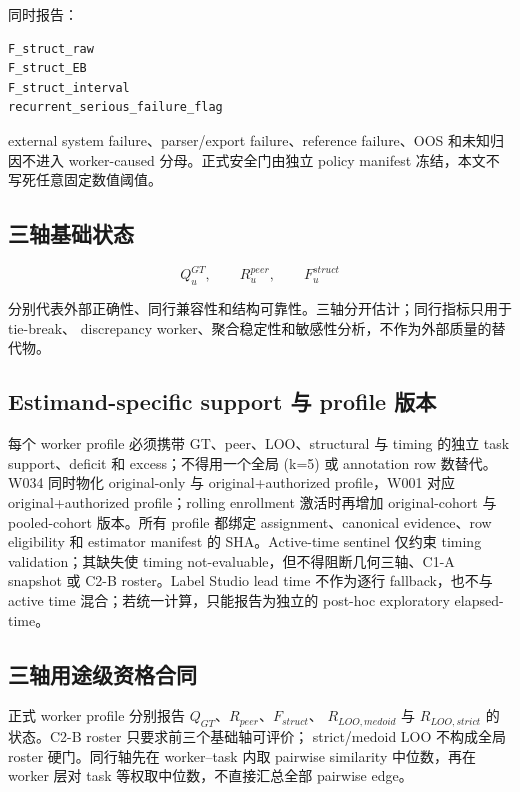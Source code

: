 同时报告：

\begin{verbatim}
F_struct_raw
F_struct_EB
F_struct_interval
recurrent_serious_failure_flag
\end{verbatim}

external system failure、parser/export failure、reference failure、OOS 和未知归因不进入
worker-caused 分母。正式安全门由独立 policy manifest 冻结，本文不写死任意固定数值阈值。

\subsection{三轴基础状态}

\[
Q^{GT}_u,\qquad R^{peer}_u,\qquad F^{struct}_u
\]

分别代表外部正确性、同行兼容性和结构可靠性。三轴分开估计；同行指标只用于 tie-break、
discrepancy worker、聚合稳定性和敏感性分析，不作为外部质量的替代物。

\subsection{Estimand-specific support 与 profile 版本}

每个 worker profile 必须携带 GT、peer、LOO、structural 与 timing 的独立 task support、deficit
和 excess；不得用一个全局 (k=5) 或 annotation row 数替代。W034 同时物化 original-only 与
original+authorized profile，W001 对应 original+authorized profile；rolling enrollment 激活时再增加
original-cohort 与 pooled-cohort 版本。所有 profile 都绑定 assignment、canonical evidence、row
eligibility 和 estimator manifest 的 SHA。Active-time sentinel 仅约束 timing validation；其缺失使 timing
not-evaluable，但不得阻断几何三轴、C1-A snapshot 或 C2-B roster。Label Studio lead time 不作为逐行
fallback，也不与 active time 混合；若统一计算，只能报告为独立的 post-hoc exploratory elapsed-time。

\subsection{三轴用途级资格合同}

正式 worker profile 分别报告 \(Q_{GT}\)、\(R_{peer}\)、\(F_{struct}\)、
\(R_{LOO,medoid}\) 与 \(R_{LOO,strict}\) 的状态。C2-B roster 只要求前三个基础轴可评价；
strict/medoid LOO 不构成全局 roster 硬门。同行轴先在 worker--task 内取 pairwise similarity
中位数，再在 worker 层对 task 等权取中位数，不直接汇总全部 pairwise edge。

